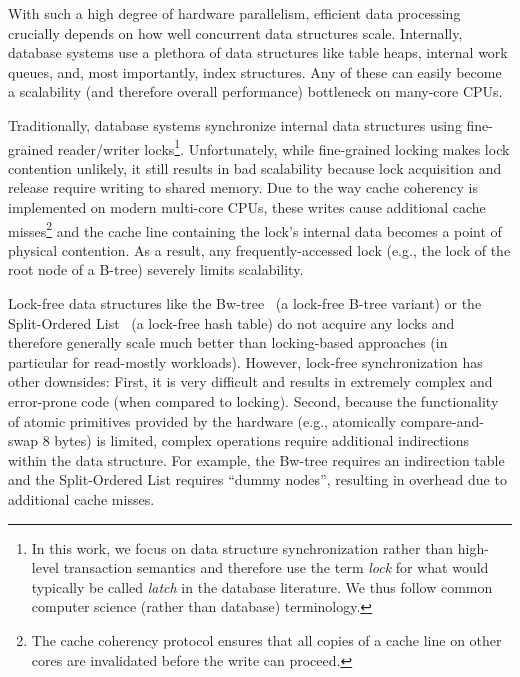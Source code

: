 \documentclass[11pt]{article}
\begin{document}
With such a high degree of hardware parallelism, efficient data processing crucially depends on how well concurrent data structures scale.
Internally, database systems use a plethora of data structures like table heaps, internal work queues, and, most importantly, index structures.
Any of these can easily become a scalability (and therefore overall performance) bottleneck on many-core CPUs.

Traditionally, database systems synchronize internal data structures using fine-grained reader/writer locks\footnote{In this work, we focus on data structure synchronization rather than high-level transaction semantics and therefore use the term {\em lock} for what would typically be called {\em latch} in the database literature. We thus follow common computer science (rather than database) terminology.}.
Unfortunately, while fine-grained locking makes lock contention unlikely, it still results in bad scalability because lock acquisition and release require writing to shared memory.
Due to the way cache coherency is implemented on modern multi-core CPUs, these writes cause additional cache misses\footnote{The cache coherency protocol ensures that all copies of a cache line on other cores are invalidated before the write can proceed.} and the cache line containing the lock's internal data becomes a point of physical contention.
As a result, any frequently-accessed lock (e.g., the lock of the root node of a B-tree) severely limits scalability.

Lock-free data structures like the Bw-tree~\cite{DBLP:conf/icde/LevandoskiLS13a} (a lock-free B-tree variant) or the Split-Ordered List~\cite{DBLP:journals/jacm/ShalevS06} (a lock-free hash table) do not acquire any locks and therefore generally scale much better than locking-based approaches (in particular for read-mostly workloads).
However, lock-free synchronization has other downsides:
First, it is very difficult and results in extremely complex and error-prone code (when compared to locking).
Second, because the functionality of atomic primitives provided by the hardware (e.g., atomically compare-and-swap 8 bytes) is limited, complex operations require additional indirections within the data structure.
For example, the Bw-tree requires an indirection table and the Split-Ordered List requires ``dummy nodes'', resulting in overhead due to additional cache misses.
\end{document}
